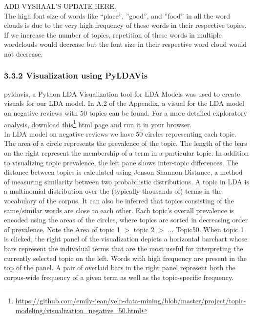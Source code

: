 \documentclass{neu_handout}
\begin{document}
ADD VYSHAAL'S UPDATE HERE.\\

The high font size of words like “place”, ”good”, and ”food” in all the word clouds is due to the very high frequency of these words in their respective topics. If we increase the number of topics, repetition of these words in multiple wordclouds would decrease but the font size in their respective word cloud would not decrease. 

\subsubsection*{3.3.2 Visualization using PyLDAVis}
pyldavis, a Python LDA Visualization tool for LDA Models was used to create visuals for our LDA model. In A.2 of the Appendix, a visual for the LDA model on negative reviews with 50 topics can be found. For a more detailed exploratory analysis, download this\footnote{\url{https://github.com/emily-jean/yelp-data-mining/blob/master/project/topic-modeling/visualization_negative_50.html}} html page and run it in your browser.\\

In LDA model on negative reviews we have 50 circles representing each topic. The area of a circle represents the prevalence of the topic. The length of the bars on the right represent the membership of a term in a particular topic. In addition to visualizing topic prevalence, the left pane shows inter-topic differences. The distance between topics is calculated using Jenson Shannon Distance, a method of measuring similarity between two probabilistic distributions. A topic in LDA is a multinomial distribution over the (typically thousands of) terms in the vocabulary of the corpus. It can also be inferred that topics consisting of the same/similar words are close to each other. Each topic’s overall prevalence is encoded using the areas of the circles, where topics are sorted in decreasing order of prevalence. Note the Area of topic 1 $>$ topic 2 $>$ ... Topic50. When topic 1 is clicked, the right panel of the visualization depicts a horizontal barchart whose bars represent the individual terms that are the most useful for interpreting the currently selected topic on the left. Words with high frequency are present in the top of the panel. A pair of overlaid bars in the right panel represent both the corpus-wide frequency of a given term as well as the topic-specific frequency.
\end{document}
